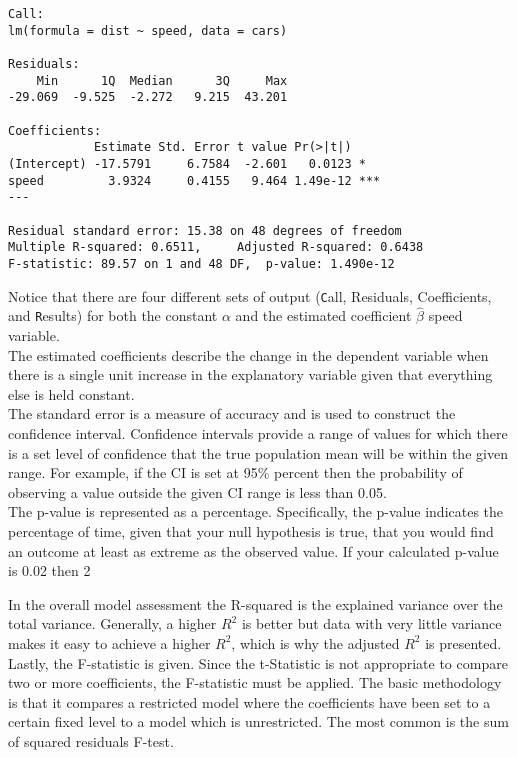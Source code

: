 \documentclass[12pt,a4paper]{article}
\theoremstyle{regla}
\theoremstyle{remark}
\theoremstyle{definition}
\theoremstyle{nonumberbreak}
\begin{document}
\begin{lstlisting}
Call:
lm(formula = dist ~ speed, data = cars)

Residuals:
    Min      1Q  Median      3Q     Max 
-29.069  -9.525  -2.272   9.215  43.201 

Coefficients:
            Estimate Std. Error t value Pr(>|t|)    
(Intercept) -17.5791     6.7584  -2.601   0.0123 *  
speed         3.9324     0.4155   9.464 1.49e-12 ***
---

Residual standard error: 15.38 on 48 degrees of freedom
Multiple R-squared: 0.6511,     Adjusted R-squared: 0.6438 
F-statistic: 89.57 on 1 and 48 DF,  p-value: 1.490e-12 
\end{lstlisting}

Notice that there are four different sets of output ({\texttt Call, Residuals, Coefficients}, and {\texttt Results}) for both the constant $\alpha$ and the estimated coefficient $\hat{\beta}$ speed variable.\\

The estimated coefficients describe the change in the dependent variable when there is a single unit increase in the explanatory variable given that everything else is held constant. \\ 

The standard error is a measure of accuracy and is used to construct the confidence interval.  Confidence intervals provide a range of values for which there is a set level of confidence that the true population mean will be within the given range. For example, if the CI is set at 95\% percent then the probability of observing a value outside the given CI range is less than 0.05.\\

The p-value is represented as a percentage.  Specifically, the p-value indicates the percentage of time, given that your null hypothesis is true, that you would find an outcome at least as extreme as the observed value. If your calculated p-value is 0.02 then 2%

In the overall model assessment the R-squared is the explained variance over the total variance.  Generally, a higher $R^2$ is better but data with very little variance makes it easy to achieve a higher $R^2$, which is why the adjusted $R^2$ is presented.\\  

Lastly, the F-statistic is given.  Since the t-Statistic is not appropriate to compare two or more coefficients, the F-statistic must be applied.  The basic methodology is that it compares a restricted model where the coefficients have been set to a certain fixed level to a model which is unrestricted.  The most common is the sum of squared residuals F-test.
\end{document}
